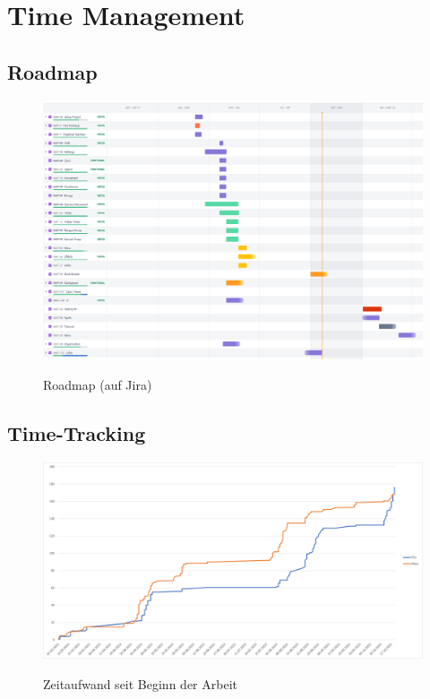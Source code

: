 \chapter{Time Management}

\section{Roadmap}
\begin{figure}[H]
    \centering
    \includegraphics[width=15cm]{resources/roadmap_r.png}\\
    \caption{Roadmap (auf Jira)}
\end{figure}    


\section{Time-Tracking}
\begin{figure}[H]
    \centering
    \includegraphics[width=15cm]{resources/graph.png}\\
    \caption{Zeitaufwand seit Beginn der Arbeit}
\end{figure}    

